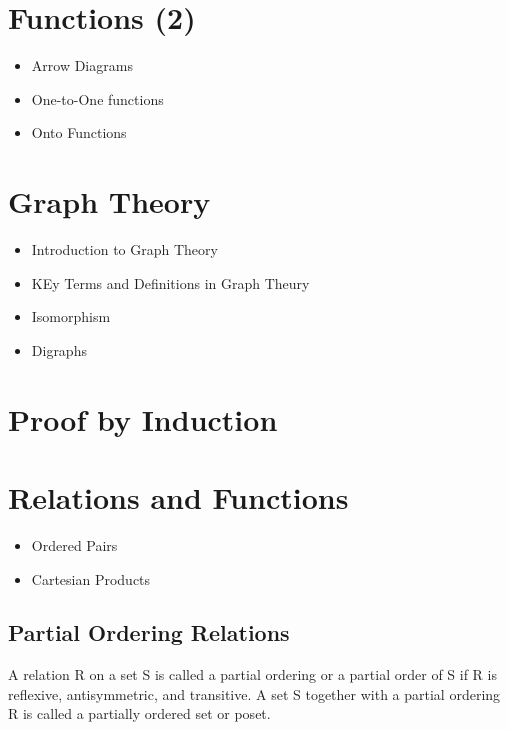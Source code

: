 \documentclass[12pt]{article}
\begin{document}
\section{Functions (2)}
\begin{itemize}
\item Arrow Diagrams
\item One-to-One functions
\item Onto Functions
\end{itemize}

\section{Graph Theory}
\begin{itemize}
\item Introduction to Graph Theory
\item KEy Terms and Definitions in Graph Theury
\item Isomorphism
\item Digraphs
\end{itemize}


\section{Proof by Induction}


\section{Relations and Functions}
\begin{itemize}
\item Ordered Pairs
\item Cartesian Products
\end{itemize}

\subsection*{Partial Ordering Relations}
A relation R on a set S is called a partial ordering or a partial order of S if R is reflexive, antisymmetric, and
transitive. A set S together with a partial ordering R is called a partially ordered set or poset.
\end{document}
